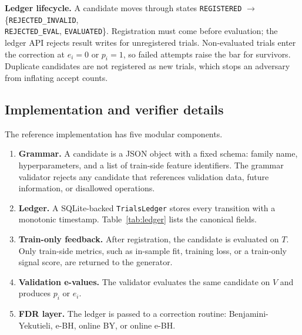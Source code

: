 \documentclass[sigconf]{acmart}
\theoremstyle{plain}
\begin{document}
\begin{sloppypar}
\textbf{Ledger lifecycle.} A candidate moves through states
\texttt{REGISTERED} $\to$ \{\texttt{REJECTED\_INVALID},\\
\texttt{REJECTED\_EVAL}, \texttt{EVALUATED}\}. Registration must come before
evaluation; the ledger API rejects result writes for unregistered trials.
Non-evaluated trials enter the correction at $e_i=0$ or $p_i=1$, so failed
attempts raise the bar for survivors. Duplicate candidates are not registered as
new trials, which stops an adversary from inflating accept counts.
\end{sloppypar}

\subsection{Implementation and verifier details}\label{sec:implementation}

The reference implementation has five modular components.
\begin{enumerate}
\item \textbf{Grammar.} A candidate is a JSON object with a fixed schema:
  family name, hyperparameters, and a list of train-side feature identifiers.
  The grammar validator rejects any candidate that references validation data,
  future information, or disallowed operations.
\item \textbf{Ledger.} A SQLite-backed \texttt{TrialsLedger} stores every
  transition with a monotonic timestamp. Table~\ref{tab:ledger} lists the
  canonical fields.
\item \textbf{Train-only feedback.} After registration, the candidate is
  evaluated on $T$. Only train-side metrics, such as in-sample fit, training
  loss, or a train-only signal score, are returned to the generator.
\item \textbf{Validation e-values.} The validator evaluates the same candidate
  on $V$ and produces $p_i$ or $e_i$.
\item \textbf{FDR layer.} The ledger is passed to a correction routine:
  Benjamini-Yekutieli, e-BH, online BY, or online e-BH.
\end{enumerate}
\end{document}
